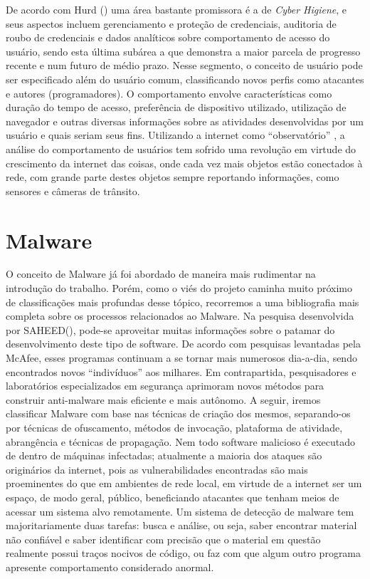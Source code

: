 De acordo com Hurd (\citeyear{hurd15}) uma área bastante promissora é a de
\emph{Cyber Higiene}, e seus aspectos incluem gerenciamento e proteção de credenciais,
auditoria de roubo de credenciais e dados analíticos sobre comportamento de
acesso do usuário, sendo esta última subárea a que demonstra a maior parcela
de progresso recente e num futuro de médio prazo. Nesse segmento, o conceito
de usuário pode ser especificado além do usuário comum, classificando novos
perfis como atacantes e autores (programadores). O comportamento envolve
características como duração do tempo de acesso, preferência de dispositivo
utilizado, utilização de navegador e outras diversas informações sobre as
atividades desenvolvidas por um usuário e quais seriam seus fins. Utilizando a
internet como ``observatório'' , a análise do comportamento de
usuários tem sofrido uma revolução em virtude do crescimento da internet das
coisas, onde cada vez mais objetos estão conectados à rede, com grande parte
destes objetos sempre reportando informações, como sensores e câmeras de
trânsito.




\section{Malware}
\label{s.malware_01}

O conceito de Malware já foi abordado de maneira mais rudimentar na introdução
do trabalho. Porém, como o viés do projeto caminha muito próximo de
classificações mais profundas desse tópico, recorremos a uma bibliografia mais
completa sobre os processos relacionados ao Malware. Na pesquisa desenvolvida
por SAHEED(\citeyear{saeed13}), pode-se aproveitar muitas informações sobre o
patamar do desenvolvimento deste tipo de software. De acordo com pesquisas
levantadas pela McAfee, esses programas continuam a se tornar mais numerosos
dia-a-dia, sendo encontrados novos ``indivíduos'' aos milhares. Em
contrapartida, pesquisadores e laboratórios especializados em segurança
aprimoram novos métodos para construir anti-malware mais eficiente e mais
autônomo. A seguir, iremos classificar Malware com base nas técnicas de
criação dos mesmos, separando-os por técnicas de ofuscamento, métodos de
invocação, plataforma de atividade, abrangência e técnicas de propagação. Nem
todo software malicioso é executado de dentro de máquinas infectadas;
atualmente a maioria dos ataques são originários da internet, pois as
vulnerabilidades encontradas são mais proeminentes do que em ambientes de rede
local, em virtude de a internet ser um espaço, de modo geral, público,
beneficiando atacantes que tenham meios de acessar um sistema alvo
remotamente. Um sistema de detecção de malware tem majoritariamente duas
tarefas: busca e análise, ou seja, saber encontrar material não confiável e
saber identificar com precisão que o material em questão realmente possui
traços nocivos de código, ou faz com que algum outro programa apresente
comportamento considerado anormal.

